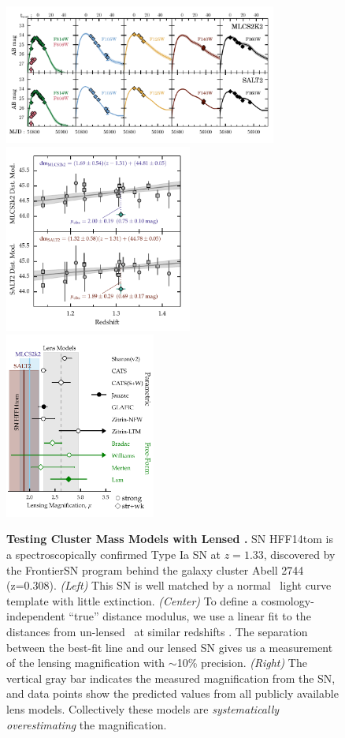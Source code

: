 \documentclass[12pt]{article}
\begin{document}
\begin{figure}
\centering
\includegraphics[width=0.8\textwidth]{FIG/snTomas_lightcurve_fit_magAB}
\includegraphics[width=0.55\textwidth]{FIG/snTomas_hubble_diagram}
\includegraphics[width=0.44\textwidth]{FIG/snTomas_magnifications}%
\caption{ \label{fig:tomas} \small
{\bf Testing Cluster Mass Models with Lensed \SNIa.}  SN HFF14tom is a
spectroscopically confirmed Type Ia SN at $z=1.33$, discovered by the
FrontierSN program behind the galaxy cluster Abell 2744 (z=0.308).
{\it(Left)} This SN is well matched by a normal \SNIa\ light curve
template with little extinction.  {\it(Center)} To define a
cosmology-independent ``true'' distance modulus, we use a linear fit
to the distances from un-lensed \SNe\ at similar
redshifts \citep{Riess:2007, Suzuki:2012}. The separation between the
best-fit line and our lensed SN gives us a measurement of the lensing
magnification with $\sim$10\% precision.  {\it (Right)} The vertical
gray bar indicates the measured magnification from the SN, and data
points show the predicted values from all publicly available lens
models. Collectively these models are {\it systematically
overestimating} the magnification. }
\end{figure}
\end{document}
